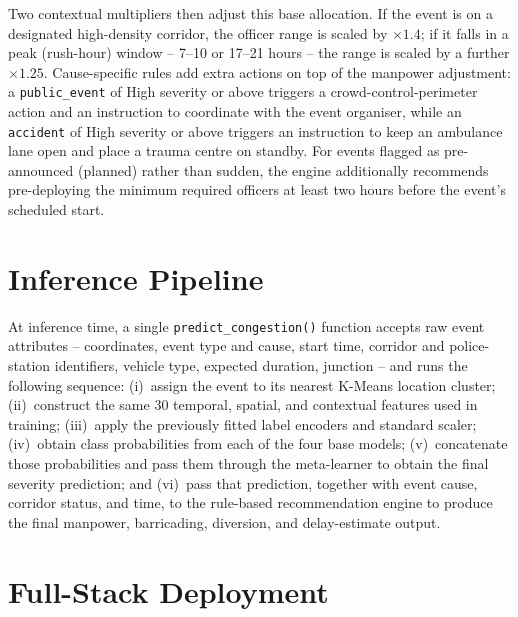 Two contextual multipliers then adjust this base allocation. If the event is on a designated high-density corridor, the officer range is scaled by $\times 1.4$; if it falls in a peak (rush-hour) window -- 7--10 or 17--21 hours -- the range is scaled by a further $\times 1.25$. Cause-specific rules add extra actions on top of the manpower adjustment: a \texttt{public\_event} of High severity or above triggers a crowd-control-perimeter action and an instruction to coordinate with the event organiser, while an \texttt{accident} of High severity or above triggers an instruction to keep an ambulance lane open and place a trauma centre on standby. For events flagged as pre-announced (planned) rather than sudden, the engine additionally recommends pre-deploying the minimum required officers at least two hours before the event's scheduled start.

\section{Inference Pipeline}
\label{sec:inference-pipeline}

At inference time, a single \texttt{predict\_congestion()} function accepts raw event attributes -- coordinates, event type and cause, start time, corridor and police-station identifiers, vehicle type, expected duration, junction -- and runs the following sequence: (i)~assign the event to its nearest K-Means location cluster; (ii)~construct the same 30 temporal, spatial, and contextual features used in training; (iii)~apply the previously fitted label encoders and standard scaler; (iv)~obtain class probabilities from each of the four base models; (v)~concatenate those probabilities and pass them through the meta-learner to obtain the final severity prediction; and (vi)~pass that prediction, together with event cause, corridor status, and time, to the rule-based recommendation engine to produce the final manpower, barricading, diversion, and delay-estimate output.

\section{Full-Stack Deployment}
\label{sec:fullstack}

